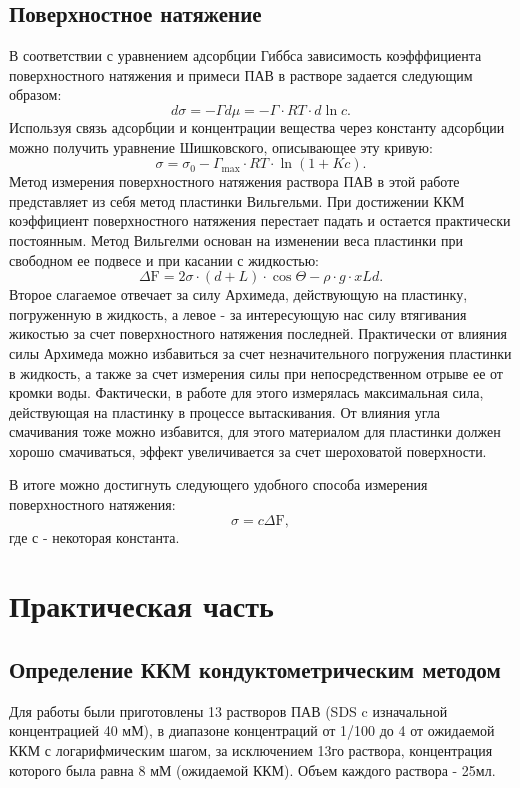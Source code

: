\documentclass[a4paper, 12pt]{article}
\begin{document}
\subsection{Поверхностное натяжение}
В соответствии с уравнением адсорбции Гиббса зависимость коэфффициента поверхностного натяжения и примеси ПАВ в растворе задается следующим образом:
\begin{equation}
d \sigma=-\Gamma d \mu=-\Gamma \cdot R T \cdot d \ln c.
\end{equation}
Используя связь адсорбции и концентрации вещества через константу адсорбции можно получить уравнение Шишковского, описывающее эту кривую:
\begin{equation}
\sigma=\sigma_{0}-\Gamma_{\max } \cdot R T \cdot \ln (1+K c).
\end{equation}
Метод измерения поверхностного натяжения раствора ПАВ в этой работе представляет из себя метод пластинки Вильгельми. При достижении ККМ коэффициент поверхностного натяжения перестает падать и остается практически постоянным. Метод Вильгелми основан на изменении веса пластинки при свободном ее подвесе и при касании с жидкостью:
$$
\Delta \mathrm{F}=2 \sigma \cdot(d+L) \cdot \cos \Theta-\rho \cdot g \cdot x L d.
$$
Второе слагаемое отвечает за силу Архимеда, действующую на пластинку, погруженную в жидкость, а левое - за интересующую нас силу втягивания жикостью за счет поверхностного натяжения последней. Практически от влияния силы Архимеда можно избавиться за счет незначительного погружения пластинки в жидкость, а также за счет измерения силы при непосредственном отрыве ее от кромки воды. Фактически, в работе для этого измерялась максимальная сила, действующая на пластинку в процессе вытаскивания. От влияния угла смачивания тоже можно избавится, для этого материалом для пластинки должен хорошо смачиваться, эффект увеличивается за счет шероховатой поверхности.

В итоге можно достигнуть следующего удобного способа измерения поверхностного натяжения:
$$
\sigma=c\Delta \mathrm{F},
$$
где с - некоторая константа. 
\section{Практическая часть}
\subsection{Определение ККМ кондуктометрическим методом}
Для работы были приготовлены 13 растворов ПАВ (SDS c изначальной концентрацией 40 мМ), в диапазоне концентраций от 1/100 до 4 от ожидаемой ККМ с логарифмическим шагом, за исключением 13го раствора, концентрация которого была равна 8 мМ (ожидаемой ККМ). Объем каждого раствора - 25мл.
 
\end{document}
